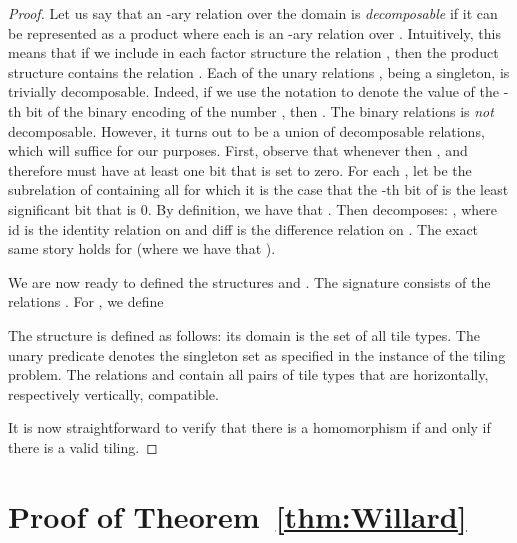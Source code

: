 \documentclass{article}
\begin{document}
\begin{proof}
Let us say that an -ary relation  over the domain  is \emph{decomposable} if it can be represented as a product  where each  is an -ary relation over . Intuitively, this means that
if we include in each factor structure  the relation , then
the product structure  contains the relation . 
Each of the unary relations , being a singleton, is trivially decomposable.
Indeed, if we use the notation  to denote the value of the -th bit of the binary encoding of the number , then .
The binary relations  is \emph{not} decomposable. However, it turns out to be a union of decomposable relations, which will suffice for our purposes. First, observe that whenever  then 
   , and therefore  must have at least one bit that is set to zero. For each , let  be the subrelation of  containing all  for which it is the case that 
the -th bit of  is the least significant bit that is 0.
By definition, we have that . Then 
     decomposes: ,
    where \textsf{id} is the identity relation on  and \textsf{diff} is the difference relation on .
The exact same story holds for 
(where we have that ).

We are now ready to defined the structures  and .
The signature consists of the relations . 
    For , we define 
    
    
    

   The structure  is defined as follows:
   its domain is the set of all tile types. The unary predicate  
  denotes the singleton set  as specified in the instance of the tiling problem.
   The relations  and  contain all pairs of tile types that are horizontally,
    respectively vertically, compatible.

    It is now straightforward to verify that there is a homomorphism 
   if and only if there is a valid tiling.
\end{proof}




\section{Proof of Theorem~\ref{thm:Willard}}
\end{document}
